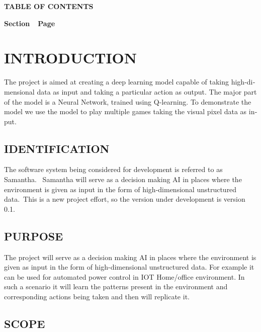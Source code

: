 \documentclass[twoside,letterpaper]{article}
\begin{document}
{\centering{}\bfseries\color{black}
TABLE OF CONTENTS
\par}


\bigskip

{\bfseries\color{black}
Section\ \ Page}

\setcounter{tocdepth}{9}
\renewcommand\contentsname{}
\tableofcontents

\bigskip
\flushleft
\clearpage\clearpage\setcounter{page}{1}
\section[INTRODUCTION]{\rmfamily\bfseries\color{black}
INTRODUCTION}
{\color{black}
\foreignlanguage{english}{{The project is aimed at creating a deep learning model capable of taking high-dimensional data as input and taking a particular action as output. The major part of the model is a Neural Network, trained using Q-learning. To demonstrate the model we use the model to play multiple games taking the visual pixel data as input.}}\foreignlanguage{english}{ \ }}

\subsection[IDENTIFICATION]{\rmfamily\bfseries\color{black}
IDENTIFICATION}
{\color{black}
The software system being considered for development is referred to as Samantha. \ Samantha will serve as a decision making AI in places where the environment is given as input in the form of high-dimensional unstructured data.\ This is a new project effort, so the
version under development is version 0.1.}

\subsection[PURPOSE]{\rmfamily\bfseries\color{black}
PURPOSE}
{\color{black}
The project will serve as a decision making AI in places where the environment is given as input in the form of high-dimensional unstructured data. For example it can be used for automated power control in IOT Home/office environment. In such a scenario it will learn the patterns present in the environment and corresponding actions being taken and then will replicate it.}

\subsection[SCOPE]{\rmfamily\bfseries\color{black}
SCOPE}
\end{document}

